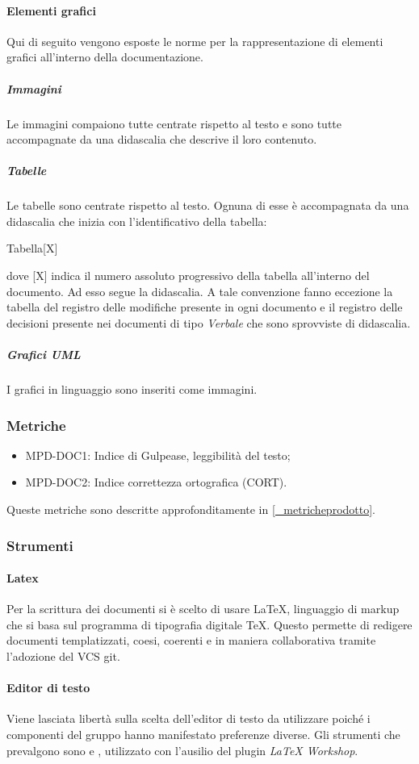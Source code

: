 \paragraph{Elementi grafici}
Qui di seguito vengono esposte le norme per la rappresentazione di elementi grafici all'interno della documentazione.
\subparagraph{Immagini}
Le immagini compaiono tutte centrate rispetto al testo e sono tutte accompagnate da una didascalia che descrive il loro contenuto.
\subparagraph{Tabelle}
Le tabelle sono centrate rispetto al testo. Ognuna di esse è accompagnata da una didascalia che inizia con l'identificativo della tabella:
\begin{center}
    Tabella[X]
\end{center}
dove [X] indica il numero assoluto progressivo della tabella all'interno del documento. Ad esso segue la  didascalia.  A tale convenzione fanno eccezione la tabella del registro delle modifiche presente in ogni documento e il registro delle decisioni presente nei documenti di tipo \textit{Verbale} che sono sprovviste di didascalia.
\subparagraph{Grafici UML}
I grafici in linguaggio  sono inseriti come immagini.

\subsubsection{Metriche}
\begin{itemize}
    \item MPD-DOC1: Indice di Gulpease, leggibilità del testo;
    \item MPD-DOC2: Indice correttezza ortografica (CORT).
\end{itemize}
Queste metriche sono descritte approfonditamente in \ref{_metricheprodotto}.

\subsubsection{Strumenti}
\paragraph{Latex}
Per la scrittura dei documenti si è scelto di usare \LaTeX, linguaggio di markup che si basa sul programma di tipografia digitale \TeX . Questo permette di redigere documenti templatizzati, coesi, coerenti e in maniera collaborativa tramite l'adozione del VCS git.
\paragraph{Editor di testo}
Viene lasciata libertà sulla scelta dell'editor di testo da utilizzare poiché i componenti del gruppo hanno manifestato preferenze diverse. Gli strumenti che prevalgono sono \textit{} e \textit{}, utilizzato con l'ausilio del plugin \textit{LaTeX Workshop}.
